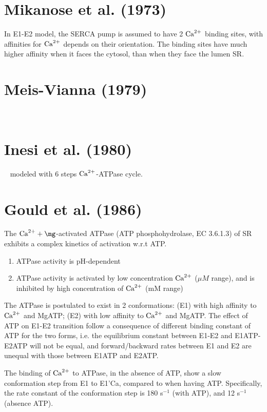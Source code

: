 \citep{sneyd2003}

\section{Mikanose et al. (1973)}
\label{sec:mikanose-et-al}

In E1-E2 model, the SERCA pump is assumed to have 2 ${\text{Ca}^{2+}}$ binding
sites, with affinities for ${\text{Ca}^{2+}}$ depends on their orientation. The
binding sites have much higher affinity when it faces the cytosol,
than when they face the lumen SR. 



\section{Meis-Vianna (1979)}
\label{sec:meis-vianna-1979}

~\citep{deMeis1979}

\section{Inesi et al. (1980)}
\label{sec:inesi-et-al}

~\citep{inesi1980} modeled with 6 steps ${\text{Ca}^{2+}}$-ATPase cycle. 


\section{Gould et al. (1986)}
\label{sec:gould-et-al}

The $\Ca+\mg$-activated ATPase (ATP phosphohydrolase, EC 3.6.1.3) of
SR exhibits a complex kinetics of activation w.r.t ATP.
\begin{enumerate}
\item ATPase activity is pH-dependent
\item ATPase activity is activated by low concentration ${\text{Ca}^{2+}}$ ($\mu M$
  range), and is inhibited by high concentration of ${\text{Ca}^{2+}}$ (mM range)
\end{enumerate}
The ATPase is postulated to exist in 2 conformations: (E1) with high
affinity to ${\text{Ca}^{2+}}$ and MgATP; (E2) with low affinity to ${\text{Ca}^{2+}}$ and
MgATP. The effect of ATP on E1-E2 transition follow a consequence of
different binding constant of ATP for the two forms, i.e. the
equilibrium constant between E1-E2 and E1ATP-E2ATP will not be equal,
and forward/backward rates between E1 and E2 are unequal with those
between E1ATP and E2ATP.

The binding of ${\text{Ca}^{2+}}$ to ATPase, in the absence of ATP, show a slow
conformation step from E1 to E1'Ca, compared to when having
ATP. Specifically, the rate constant of the conformation step is 180
s$^{-1}$ (with ATP), and 12 s$^{-1}$ (absence ATP). 


